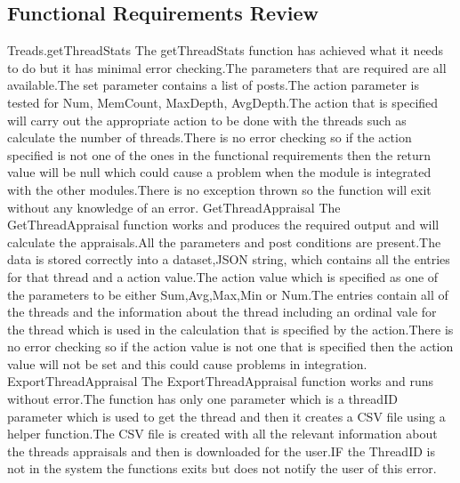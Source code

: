 \subsection{Functional Requirements Review}
Treads.getThreadStats
The getThreadStats function has achieved what it needs to do but it has minimal error checking.The parameters that are required are all available.The set parameter contains a list of posts.The action parameter is tested for Num, MemCount, MaxDepth, AvgDepth.The action that is specified will carry out the appropriate action to be done with the threads such as calculate the number of threads.There is no error checking so if the action specified is not one of the ones in the functional requirements then the return value will be null which could cause a problem when the module is integrated with the other modules.There is no exception thrown so the function will exit without any knowledge of an error.
GetThreadAppraisal
The GetThreadAppraisal function works and produces the required output and will calculate the appraisals.All the parameters and post conditions are present.The data is stored correctly into a dataset,JSON string, which contains all the entries for that thread and a action value.The action value which is specified as one of the parameters to be either Sum,Avg,Max,Min or Num.The entries contain all of the threads and the information about the thread including an ordinal vale for the thread which is used in the calculation that is specified by the action.There is no error checking so if the action value is not one that is specified then the action value will not be set and this could cause problems in integration.
ExportThreadAppraisal
The ExportThreadAppraisal function works and runs without error.The function has only one parameter which is a threadID parameter which is used to get the thread and then it creates a CSV file using a helper function.The CSV file is created with all the relevant information about the threads appraisals and then is downloaded for the user.IF the ThreadID is not in the system the functions exits but does not notify the user of this error.